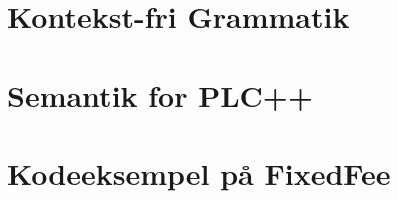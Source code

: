\appendix

\chapter{Kontekst-fri Grammatik}
\label{bil:cfg}


\label{FIRSTAPPENDIX} %

\chapter{Semantik for PLC++}
\label{bil:semantik}


\chapter{Kodeeksempel på FixedFee}
\label{bil:fixedfee}


\label{LASTAPPENDIX}



%

%


%

%